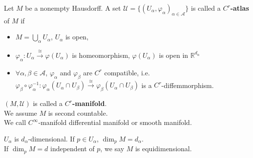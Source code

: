 \begin{definition}
    Let  $ M  $ be a nonempty Hausdorff. A set  $ \mathcal{U}=\{(U_\alpha,\varphi_\alpha)_{\alpha\in \mathcal{A}}\} $ is called a  \textbf{$ C^r $-atlas} of  $ M  $ if 
    \begin{itemize}
        \item  $ M=\bigcup\limits_\alpha U_\alpha $,  $ U_\alpha $ is open,
        \item  $ \varphi_\alpha:U_\alpha\xrightarrow{\cong}\varphi(U_\alpha) $ is  homeomorphism,  $ \varphi(U_\alpha) $ is open in  $ \mathbb{R}^{d_\alpha} $
        \item  $ \forall \alpha,\beta\in\mathcal{A} $,  $ \varphi_\alpha $ and  $ \varphi_\beta $ are  $ C^r $ compatible, i.e. $ \varphi_\beta\circ\varphi_\alpha^{-1}:\varphi_\alpha(U_\alpha\cap U_\beta)\xrightarrow{\cong}\varphi_\beta(U_\alpha\cap U_\beta) $ is a  $ C^r $-diffemmorphism.       
    \end{itemize} 
     $ (M,\mathcal{U}) $ is called a  \textbf{$ C^r $-manifold}.\\
     We assume  $ M  $ is second countable.\\
     We call  $ C^\infty $-manifold differential manifold or smooth manifold.  
\end{definition}
\begin{definition}
     $ U_\alpha $ is  $ d_\alpha $-dimensional. If  $ p\in U_\alpha $,  $ \dim_p M=d_\alpha $.\\
     If  $ \dim_p M=d $ independent of  $ p $, we say  $ M  $ is equidimensional.   
\end{definition}

